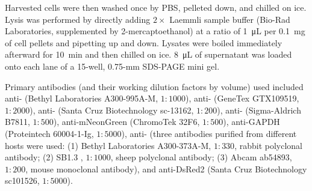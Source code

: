 Harvested cells were then washed once by PBS, pelleted down, and chilled on ice. Lysis was performed by directly adding $2 \times$ Laemmli sample buffer (Bio-Rad Laboratories, supplemented by 2-mercaptoethanol) at a ratio of \SI{1}{\micro L} per \SI{0.1}{mg} of cell pellets and pipetting up and down. Lysates were boiled immediately afterward for \SI{10}{min} and then chilled on ice. \SI{8}{\micro L} of supernatant was loaded onto each lane of a 15-well, 0.75-mm SDS-PAGE mini gel.

Primary antibodies (and their working dilution factors by volume) used included anti- (Bethyl Laboratories A300-995A-M, $1 : 1000$), anti- (GeneTex GTX109519, $1 : 2000$), anti- (Santa Cruz Biotechnology sc-13162, $1 : 200$), anti- (Sigma-Aldrich B7811, $1 : 500$), anti-mNeonGreen (ChromoTek 32F6, $1 : 500$), anti-GAPDH (Proteintech 60004-1-Ig, $1 : 5000$), anti- (three antibodies purified from different hosts were used: (1) Bethyl Laboratories A300-373A-M, $1 : 330$, rabbit polyclonal antibody; (2) SB1.3 \cite{SheepAntiBUB1}, $1 : 1000$, sheep polyclonal antibody; (3) Abcam ab54893, $1 : 200$, mouse monoclonal antibody), and anti-DsRed2 (Santa Cruz Biotechnology sc101526, $1 : 5000$).

